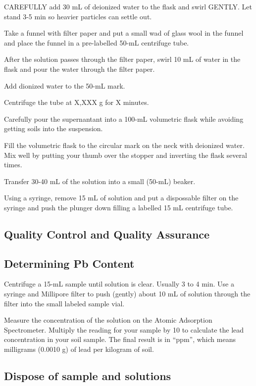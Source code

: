 \documentclass[12pt]{../SOP3_alpha}
\begin{document}
\NP CAREFULLY add 30 mL of deionized water to the flask and swirl GENTLY. Let stand 3-5 min so heavier particles can  settle out.

\NP Take a funnel with filter paper and put a small wad of glass wool in the funnel and place the funnel in a pre-labelled 50-mL centrifuge tube. 

\NP After the solution passes through the filter paper, swirl 10 mL of water in the flask and pour the water through the filter paper. 

\NP Add dionized water to the 50-mL mark.

\NP Centrifuge the tube at X,XXX g for X minutes.

\NP Carefully pour the supernantant into a 100-mL volumetric flask while avoiding getting soils into the suspension. 

\NP Fill the volumetric flask to the circular mark on the neck with deionized water. Mix well by putting your thumb over the stopper and inverting the flask several times. 

\NP Transfer 30-40 mL of the solution into a small (50-mL) beaker.

\NP Using a syringe, remove 15 mL of solution and put a dispossable filter on the syringe and push the plunger down filling a labelled 15 mL centrifuge tube. 

\subsection{Quality Control and Quality Assurance}

\subsection{Determining Pb Content}

\NP Centrifuge a 15-mL sample until solution is clear. Usually 3 to 4 min. Use a syringe and Millipore filter to push (gently) about 10 mL of solution through the filter into the small labeled sample vial.

\NP Measure the concentration of the solution on the Atomic Adsorption Spectrometer.  Multiply the reading for your sample by 10 to calculate the lead concentration in your soil sample.  The final result is in “ppm”, which means milligrams (0.0010 g) of lead per kilogram of soil.

\subsection{Dispose of sample and solutions}
\end{document}
